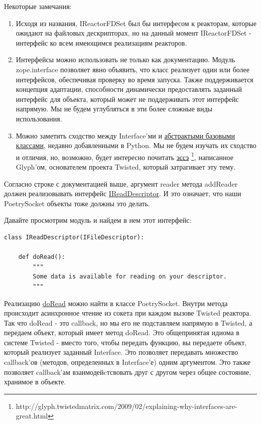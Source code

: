 Некоторые замечания:

\begin{enumerate}

\item Исходя из названия, IReactorFDSet был бы интерфесом к реакторам, 
которые ожидают на файловых дескрипторах, но на данный момент IReactorFDSet - 
интерфейс ко всем имеющимся реализациям реакторов. 

\item Интерфейсы можно использовать не только как документацию. 
Модуль zope.interface позволяет явно объявить, что класс 
реализует один или более интерфейсов, обеспечивая проверку 
во время запуска. Также поддерживается концепция адаптации, 
способности динамически предоставлять заданный интерфейс для 
объекта, который может не поддерживать этот интерфейс напрямую. 
Мы не будем углубляться в эти более сложные виды использования.

\item Можно заметить сходство между Interface'ми и 
\href{http://www.python.org/dev/peps/pep-3119/}{абстрактыми базовыми 
классами}, недавно добавленными в Python. Мы не будем изучать 
их сходство и отличия, но, возможно, будет интересно почитать 
\href{http://glyph.twistedmatrix.com/2009/02/explaining-why-interfaces-are-great.html}{эссэ}
\footnote{http://glyph.twistedmatrix.com/2009/02/explaining-why-interfaces-are-great.html}, 
написанное Glyph'ом, основателем проекта Twisted, который 
затрагивает эту тему.

\end{enumerate}


Согласно строке с документацией выше, аргумент reader метода 
addReader должен реализовывать интерфейс 
\href{http://twistedmatrix.com/trac/browser/tags/releases/twisted-8.2.0/twisted/internet/interfaces.py#L947}{IReadDescriptor}. И это 
означает, что наши PoetrySocket объекты тоже должны это делать.


Давайте просмотрим модуль и найдем в нем этот интерфейс:

\begin{scriptsize}\begin{verbatim}
class IReadDescriptor(IFileDescriptor):

    def doRead():
        """
        Some data is available for reading on your descriptor.
        """
\end{verbatim}\end{scriptsize}


Реализацию 
\href{http://github.com/jdavisp3/twisted-intro/blob/master/twisted-client-1/get-poetry.py#L88}{doRead} 
можно найти в классе PoetrySocket. 
Внутри метода происходит асинхронное чтение из сокета при каждом 
вызове Twisted реактора. Так что doRead - это callback, 
но мы его не подставляем напрямую в Twisted, а передаем 
объект, который имеет метод doRead. Это общепринятая идиома в системе 
Twisted - вместо того, чтобы передать функцию, вы передаете 
объект, который реализует заданный Interface. Это позволяет передавать 
множество callback'ов (методов, определенных в Interface'е) одним 
аргументом. Это также позволяет callback'ам взаимодейcтсвовать 
друг с другом через общее состояние, хранимое в объекте.


